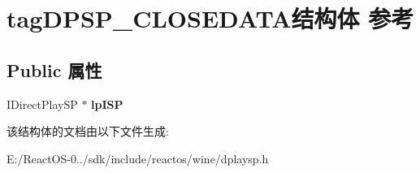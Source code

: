 \hypertarget{structtag_d_p_s_p___c_l_o_s_e_d_a_t_a}{}\section{tag\+D\+P\+S\+P\+\_\+\+C\+L\+O\+S\+E\+D\+A\+T\+A结构体 参考}
\label{structtag_d_p_s_p___c_l_o_s_e_d_a_t_a}
\subsection*{Public 属性}
\begin{DoxyCompactItemize}
\item 
\mbox{\label{structtag_d_p_s_p___c_l_o_s_e_d_a_t_a_aab27d9ad5ffe1f3b0ec63a78952aa173}} 
I\+Direct\+Play\+SP $\ast$ {\bfseries lp\+I\+SP}
\end{DoxyCompactItemize}


该结构体的文档由以下文件生成\+:\begin{DoxyCompactItemize}
\item 
E\+:/\+React\+O\+S-\/0../sdk/include/reactos/wine/dplaysp.\+h\end{DoxyCompactItemize}
